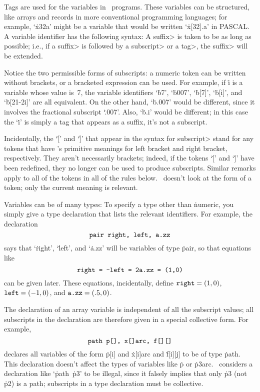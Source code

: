 Tags are used for the variables in \MF\ programs. These variables can
be structured, like arrays and records in more conventional programming
languages; for example, `\.{x32a}' might be a variable that would be written
`\.{x[32].a}' in {\mc PASCAL}. A variable identifier has the following
syntax:
A \<suffix> is taken to be as long as possible; i.e., if a \<suffix> is
followed by a \<subscript> or a \<tag>, the \<suffix> will be extended.

Notice the two permissible forms of subscripts: a numeric token can be
written without brackets, or a bracketed expression can be used.
For example, if \.i is a variable whose value is~7, the variable identifiers
`\.{b7}', `\.{b007}', `\.{b[7]}', `\.{b[i]}', and `\.{b[21-2i]}' are
all equivalent. On the other hand, `\.{b.007}' would be different, since
it involves the fractional subscript `\.{.007}'. Also, `\.{b.i}' would
be different; in this case the `\.i' is simply a tag that appears as a suffix,
it's not a subscript.

Incidentally, the `\.[' and `\.]' that appear in the syntax for
\<subscript> stand for any tokens that have \MF's primitive meanings
for left bracket and right bracket, respectively. They aren't necessarily
brackets; indeed, if the tokens `\.[' and `\.]' have been redefined,
they no longer can be used to produce subscripts. Similar remarks
apply to all of the tokens in all of the rules below. \MF\ doesn't look
at the form of a token; only the current meaning is relevant.

Variables can be of many types:
To specify a type other than \.{numeric}, you simply give a type
declaration that lists the relevant identifiers. For example, the declaration
$$\hbox{\tt pair right, left, a.zz}$$
says that `\.{right}', `\.{left}', and `\.{a.zz}' will be variables of type
\.{pair}, so that equations like
$$\hbox{\tt right = -left = 2a.zz = (1,0)}$$
can be given later. These equations, incidentally, define
$\.{right}=(1,0)$, $\.{left}=(-1,0)$, and $\.{a.zz}=(.5,0)$.

The declaration of an array variable is independent of all the subscript
values; all subscripts in the declaration are therefore given in a
special collective form. For example,
$$\hbox{\tt path p[], x[]arc, f[][]}$$
declares all variables of the form \.{p[i]} and \.{x[i]arc} and \.{f[i][j]}
to be of type \.{path}. This declaration doesn't affect the types of
variables like \.p or \.{p3arc}. \MF\ considers a declaration
like `\.{path}~\.{p3}' to be illegal, since it falsely implies that only
\.{p3} (not \.{p2}) is a path; subscripts in a type declaration must
be collective.

